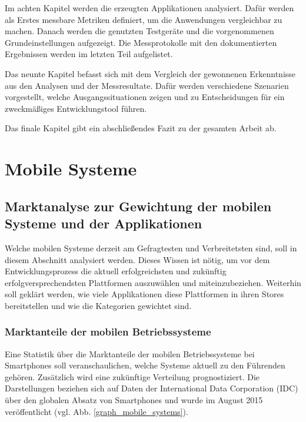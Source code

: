 \bigskip
Im achten Kapitel werden die erzeugten Applikationen analysiert. Dafür werden als Erstes messbare Metriken definiert, um die Anwendungen vergleichbar zu machen. Danach werden die genutzten Testgeräte und die vorgenommenen Grundeinstellungen aufgezeigt. Die Messprotokolle mit den dokumentierten Ergebnissen werden im letzten Teil aufgelistet.

\bigskip
Das neunte Kapitel befasst sich mit dem Vergleich der gewonnenen Erkenntnisse aus den Analysen und der Messresultate. Dafür werden verschiedene Szenarien vorgestellt, welche Ausgangssituationen zeigen und zu Entscheidungen für ein zweckmäßiges Entwicklungstool führen.

\bigskip
Das finale Kapitel gibt ein abschließendes Fazit zu der gesamten Arbeit ab.

\chapter{Mobile Systeme}

\section{Marktanalyse zur Gewichtung der mobilen Systeme und der Applikationen}
Welche mobilen Systeme derzeit am Gefragtesten und Verbreitetsten sind, soll in diesem Abschnitt analysiert werden. Dieses Wissen ist nötig, um vor dem Entwicklungsprozess die aktuell erfolgreichsten und zukünftig erfolgversprechendsten Plattformen auszuwählen und miteinzubeziehen.
Weiterhin soll geklärt werden, wie viele Applikationen diese Plattformen in ihren Stores bereitstellen und wie die Kategorien gewichtet sind.

\subsection{Marktanteile der mobilen Betriebssysteme}
\label{subsec:Marktanteile_mobile_Systeme}
Eine Statistik über die Marktanteile der mobilen Betriebssysteme bei Smartphones soll veranschaulichen, welche Systeme aktuell zu den Führenden gehören. Zusätzlich wird eine zukünftige Verteilung prognostiziert. Die Darstellungen beziehen sich auf Daten der International Data Corporation (IDC) über den globalen Absatz von Smartphones und wurde im August 2015 veröffentlicht (vgl. Abb. \ref{graph_mobile_systems}). 

